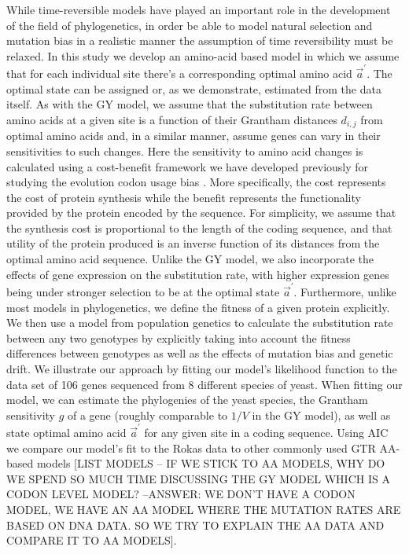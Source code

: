 \documentclass[13pt]{article}
\newcommand{\avecopt}{\ensuremath{\vec{a}^\prime}\xspace}
\begin{document}
While time-reversible models have played an important role in the development of the field of phylogenetics,  in order be able to model natural selection and mutation bias in a realistic manner the assumption of time reversibility must be relaxed.
In this study we develop an amino-acid based model in which we assume that for each individual site there's a corresponding optimal amino acid $\avecopt$.
The optimal state can be assigned or, as we demonstrate, estimated from the data itself.
As with the GY model, we assume that the substitution rate between amino acids at a given site is a function of their Grantham distances $d_{i,j}$ from optimal amino acids and, in a similar manner, assume genes can vary in their sensitivities to such changes.
Here the sensitivity to amino acid changes is calculated using a cost-benefit framework we have developed previously for studying the evolution codon usage bias \cite{Gilchrist07, GilchristEtAl09,ShahAndGilchrist11}.
More specifically, the cost represents the cost of protein synthesis while the benefit represents the functionality provided by the protein encoded by the sequence.
For simplicity, we assume that the synthesis cost is proportional to the length of the coding sequence, and that utility of the protein produced is an inverse function of its distances from the optimal amino acid sequence.
Unlike the GY model, we also incorporate the effects of gene expression on the substitution rate, with higher expression genes being under stronger selection to be at the optimal state $\avecopt$.
Furthermore, unlike most models in phylogenetics, we define the fitness of a given protein explicitly.
We then use a model from population genetics to calculate the substitution rate between any two genotypes by explicitly taking into account the fitness differences between genotypes as well as the effects of mutation bias and genetic drift.
We illustrate our approach by fitting our model's likelihood function to the \cite{RokasEtAl03} data set of 106 genes sequenced from 8 different species of yeast.
When fitting our model, we can estimate the phylogenies of the yeast species, the Grantham sensitivity $g$ of a gene (roughly comparable to $1/V$ in the GY model), as well as state optimal amino acid $\avecopt$ for any given site in a coding sequence.
Using AIC we compare our model's fit to the Rokas data to other commonly used GTR AA-based models [LIST MODELS -- IF WE STICK TO AA MODELS, WHY DO WE SPEND SO MUCH TIME DISCUSSING THE GY MODEL WHICH IS A CODON LEVEL MODEL? --ANSWER: WE DON'T HAVE A CODON MODEL, WE HAVE AN AA MODEL WHERE THE MUTATION RATES ARE BASED ON DNA DATA. SO WE TRY TO EXPLAIN THE AA DATA AND COMPARE IT TO AA MODELS].
\end{document}
